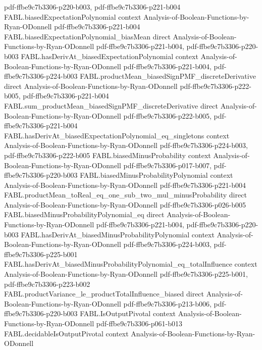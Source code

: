 \begin{theorem}
  {pdf-ffbe9c7b3306-p220-b003,
    pdf-ffbe9c7b3306-p221-b004}
\proofstep
  {FABL.biasedExpectationPolynomial}
  {context}
  {Analysis-of-Boolean-Functions-by-Ryan-ODonnell}
  {pdf-ffbe9c7b3306-p221-b004}
\proofstep
  {FABL.biasedExpectationPolynomial_biasMean}
  {direct}
  {Analysis-of-Boolean-Functions-by-Ryan-ODonnell}
  {pdf-ffbe9c7b3306-p221-b004,
    pdf-ffbe9c7b3306-p220-b003}
\proofstep
  {FABL.hasDerivAt_biasedExpectationPolynomial}
  {context}
  {Analysis-of-Boolean-Functions-by-Ryan-ODonnell}
  {pdf-ffbe9c7b3306-p221-b004,
    pdf-ffbe9c7b3306-p224-b003}
\proofstep
  {FABL.productMean_biasedSignPMF_discreteDerivative}
  {direct}
  {Analysis-of-Boolean-Functions-by-Ryan-ODonnell}
  {pdf-ffbe9c7b3306-p222-b005,
    pdf-ffbe9c7b3306-p221-b004}
\proofstep
  {FABL.sum_productMean_biasedSignPMF_discreteDerivative}
  {direct}
  {Analysis-of-Boolean-Functions-by-Ryan-ODonnell}
  {pdf-ffbe9c7b3306-p222-b005,
    pdf-ffbe9c7b3306-p221-b004}
\proofstep
  {FABL.hasDerivAt_biasedExpectationPolynomial_eq_singletons}
  {context}
  {Analysis-of-Boolean-Functions-by-Ryan-ODonnell}
  {pdf-ffbe9c7b3306-p224-b003,
    pdf-ffbe9c7b3306-p222-b005}
\proofstep
  {FABL.biasedMinusProbability}
  {context}
  {Analysis-of-Boolean-Functions-by-Ryan-ODonnell}
  {pdf-ffbe9c7b3306-p017-b007,
    pdf-ffbe9c7b3306-p220-b003}
\proofstep
  {FABL.biasedMinusProbabilityPolynomial}
  {context}
  {Analysis-of-Boolean-Functions-by-Ryan-ODonnell}
  {pdf-ffbe9c7b3306-p221-b004}
\proofstep
  {FABL.productMean_toReal_eq_one_sub_two_mul_minusProbability}
  {direct}
  {Analysis-of-Boolean-Functions-by-Ryan-ODonnell}
  {pdf-ffbe9c7b3306-p026-b005}
\proofstep
  {FABL.biasedMinusProbabilityPolynomial_eq}
  {direct}
  {Analysis-of-Boolean-Functions-by-Ryan-ODonnell}
  {pdf-ffbe9c7b3306-p221-b004,
    pdf-ffbe9c7b3306-p220-b003}
\proofstep
  {FABL.hasDerivAt_biasedMinusProbabilityPolynomial}
  {context}
  {Analysis-of-Boolean-Functions-by-Ryan-ODonnell}
  {pdf-ffbe9c7b3306-p224-b003,
    pdf-ffbe9c7b3306-p225-b001}
\proofstep
  {FABL.hasDerivAt_biasedMinusProbabilityPolynomial_eq_totalInfluence}
  {context}
  {Analysis-of-Boolean-Functions-by-Ryan-ODonnell}
  {pdf-ffbe9c7b3306-p225-b001,
    pdf-ffbe9c7b3306-p223-b002}
\proofstep
  {FABL.productVariance_le_productTotalInfluence_biased}
  {direct}
  {Analysis-of-Boolean-Functions-by-Ryan-ODonnell}
  {pdf-ffbe9c7b3306-p213-b006,
    pdf-ffbe9c7b3306-p220-b003}
\proofstep
  {FABL.IsOutputPivotal}
  {context}
  {Analysis-of-Boolean-Functions-by-Ryan-ODonnell}
  {pdf-ffbe9c7b3306-p061-b013}
\proofstep
  {FABL.decidableIsOutputPivotal}
  {context}
  {Analysis-of-Boolean-Functions-by-Ryan-ODonnell}

\end{theorem}
